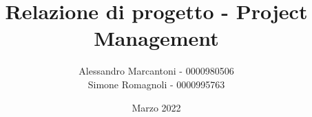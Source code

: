 \title{Relazione di progetto - Project Management}
\author{Alessandro Marcantoni - 0000980506\\
Simone Romagnoli - 0000995763}
\date{Marzo 2022}